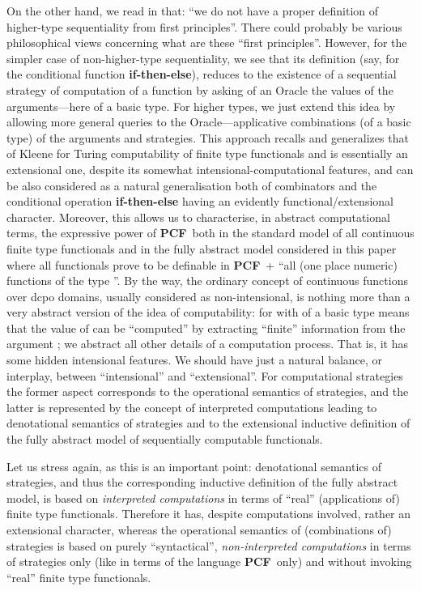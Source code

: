 \documentclass[fleqn]{LMCS}
\theoremstyle{plain}\newtheorem{satz}[thm]{Satz}
\theoremstyle{plain}\newtheorem{hyp}[thm]{Hypothesis}
\theoremstyle{plain}\newtheorem{hyps}[thm]{Hypotheses}
\theoremstyle{definition}\newtheorem{note}[thm]{Note}
\newcommand{\PCF}{\mbox{\bf PCF}}
\newcommand{\?}{\mbox{?}}
\begin{document}
On the other hand, we read in 
\cite{Hyland-Ong2000} that: 
``we do not have a proper definition of higher-type 
sequentiality from first principles''. 
There could probably be various philosophical 
views concerning 
what are these ``first principles''. 
However, for the simpler case of non-higher-type sequentiality, 
we see that its definition (say, for the conditional 
function {\bf if-then-else}), 
reduces to the existence of a sequential strategy of 
computation of a function by asking of an Oracle the 
values of the arguments---here of a basic type. 
For higher types, 
we just extend this idea by allowing more general queries 
to the Oracle---applicative 
combinations 
(of a basic type) of the arguments and strategies. 
This approach recalls and generalizes that 
of Kleene \cite{Kleene60,Kleene62} for Turing computability of finite 
type functionals and is essentially an extensional one, 
despite its somewhat intensional-computational features, 
and can be also considered as a natural generalisation both of combinators 
and the conditional operation {\bf if-then-else} having an evidently 
functional/extensional character. 
Moreover, this allows us to characterise, in abstract computational terms, 
the expressive power of \PCF\ both in the standard model  
of all continuous finite type functionals \cite{Saz76AL} and 
in the fully abstract model  considered in this paper where 
all functionals prove to be definable in \PCF\ + ``all (one place 
numeric) functions of the type ''. 
By the way, the ordinary 
concept of continuous functions over dcpo domains, 
usually considered as non-intensional, 
is nothing more than a very abstract version of the idea of 
computability:  for  with  of a basic type 
means that the value of  can be ``computed'' by extracting ``finite'' information 
 from the argument ; we abstract all other details of a computation process. 
That is, it has some hidden 
intensional features. We should have just a natural balance, or interplay, 
between ``intensional'' and ``extensional''. 
For computational strategies the former aspect corresponds to the operational 
semantics of strategies, and the latter is represented by the concept of 
interpreted computations leading to denotational semantics of strategies and 
to the extensional inductive definition of the fully abstract model of 
sequentially computable functionals. 

Let us stress again, as this is an important point: 
denotational semantics of strategies, and thus 
the corresponding inductive definition of the fully abstract model, is based on 
\emph{interpreted computations} in terms of ``real'' (applications of) 
finite type functionals. Therefore it has, despite computations involved, 
rather an extensional character, whereas the operational semantics of 
(combinations of) strategies is based on purely ``syntactical'', 
\emph{non-interpreted computations} 
in terms of strategies only (like in terms of the language \PCF\ only) 
and without invoking ``real'' finite type 
functionals.
\end{document}
